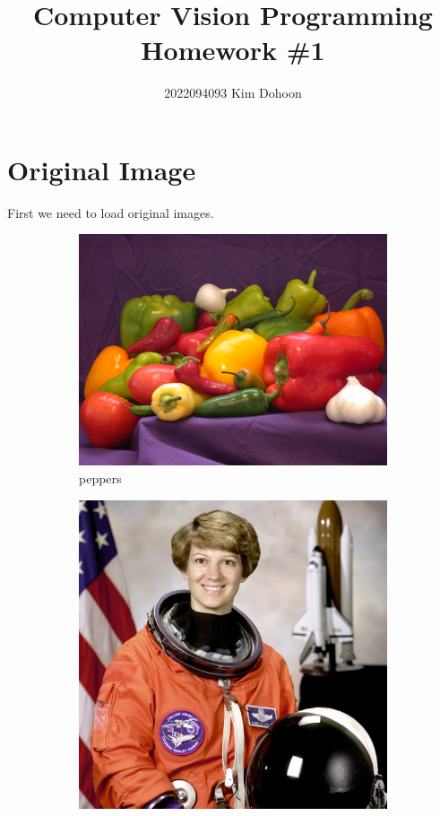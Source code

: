\documentclass{article}
\title{Computer Vision Programming Homework \#1}
\author{2022094093 Kim Dohoon}
\affil{Department of Data Science, Major in Data Science}
\begin{document}
\maketitle

\section{Original Image}
First we need to load original images.
\begin{figure}[!ht]
    \centering
    \begin{subfigure}{0.356\textwidth}
        \includegraphics[width=\textwidth]{./fig/peppers.png}
        \caption{peppers}
    \end{subfigure}
    \begin{subfigure}{0.267\textwidth}
        \includegraphics[width=\textwidth]{./fig/astronaut.png}

\end{subfigure}
\end{figure}
\end{document}
